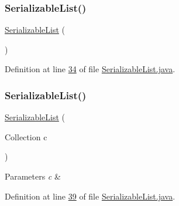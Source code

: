 \subsubsection{\texorpdfstring{Serializable\+List()}{SerializableList()}\hspace{0.1cm}{\footnotesize\ttfamily [1/3]}}
{\footnotesize\ttfamily \hyperlink{classdata_1_1_serializable_list}{Serializable\+List} (\begin{DoxyParamCaption}{ }\end{DoxyParamCaption})}



Definition at line \hyperlink{_serializable_list_8java_source_l00034}{34} of file \hyperlink{_serializable_list_8java_source}{Serializable\+List.\+java}.

\hypertarget{classdata_1_1_serializable_list_ad709ead5deacaba5d351ce90f5379e6e}{}\label{classdata_1_1_serializable_list_ad709ead5deacaba5d351ce90f5379e6e} 
\subsubsection{\texorpdfstring{Serializable\+List()}{SerializableList()}\hspace{0.1cm}{\footnotesize\ttfamily [2/3]}}
{\footnotesize\ttfamily \hyperlink{classdata_1_1_serializable_list}{Serializable\+List} (\begin{DoxyParamCaption}\item[{Collection}]{c }\end{DoxyParamCaption})}


\begin{DoxyParams}{Parameters}
{\em c} & \\
\hline
\end{DoxyParams}


Definition at line \hyperlink{_serializable_list_8java_source_l00039}{39} of file \hyperlink{_serializable_list_8java_source}{Serializable\+List.\+java}.

\hypertarget{classdata_1_1_serializable_list_a3e055eba65ba1ec82ff42691f7a4b4d4}{}\label{classdata_1_1_serializable_list_a3e055eba65ba1ec82ff42691f7a4b4d4} 
